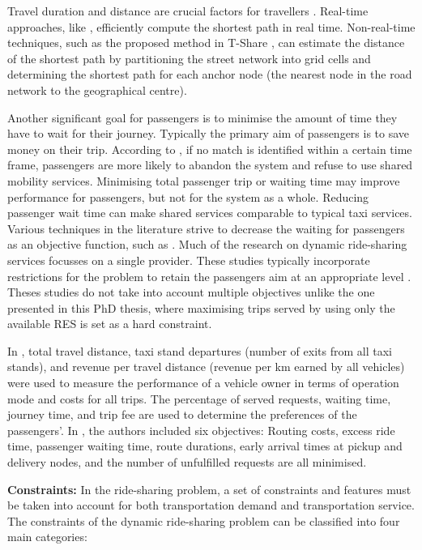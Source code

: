 Travel duration and distance are crucial factors for travellers \cite{naoum2015stochastic133}. Real-time approaches, like \cite{delling2009engineering}, efficiently compute the shortest path in real time. Non-real-time techniques, such as the proposed method in T-Share \cite{ma2013tshare}, can estimate the distance of the shortest path by partitioning the street network into grid cells and determining the shortest path for each anchor node (the nearest node in the road network to the geographical centre). 

Another significant goal for passengers is to minimise the amount of time they have to wait for their journey. Typically the primary aim of passengers is to save money on their trip. According to \cite{stiglic2016making162}, if no match is identified within a certain time frame, passengers are more likely to abandon the system and refuse to use shared mobility services. Minimising total passenger trip or waiting time may improve performance for passengers, but not for the system as a whole. Reducing passenger wait time can make shared services comparable to typical taxi services. Various techniques in the literature strive to decrease the waiting for passengers as an objective function, such as \cite{hyland2018sharing87, kirchler2013granular96, masoud2017using126}. Much of the research on dynamic ride-sharing services focusses on a single provider. These studies typically incorporate restrictions for the problem to retain the passengers aim at an appropriate level \cite{molenbruch2017typology128, calvo2004distributed38}. Theses studies do not take into account multiple objectives unlike the one presented in this PhD thesis, where maximising trips served by using only the available RES is set as a hard constraint.  

In \cite{dorey2014ridesharing53}, total travel distance, taxi stand departures (number of exits from all taxi stands), and revenue per travel distance (revenue per km earned by all vehicles) were used to measure the performance of a vehicle owner in terms of operation mode and costs for all trips. The percentage of served requests, waiting time, journey time, and trip fee are used to determine the preferences of the passengers'. In \cite{kirchler2013granular96}, the authors included six objectives: Routing costs, excess ride time, passenger waiting time, route durations, early arrival times at pickup and delivery nodes, and the number of unfulfilled requests are all minimised.

\textbf{Constraints: }In the ride-sharing problem, a set of constraints and features must be taken into account for both transportation demand and transportation service. The constraints of the dynamic ride-sharing problem can be classified into four main categories:

